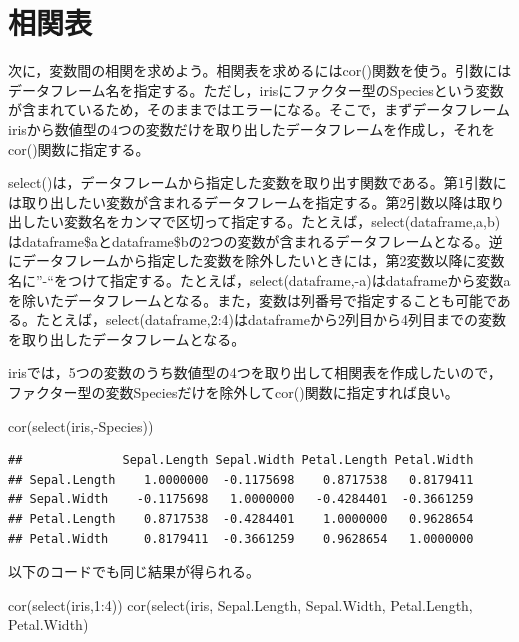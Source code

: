 \documentclass[
]{book}
\newenvironment{Shaded}{\begin{snugshade}}{\end{snugshade}}
\newcommand{\DecValTok}[1]{\textcolor[rgb]{0.00,0.00,0.81}{#1}}
\newcommand{\FunctionTok}[1]{\textcolor[rgb]{0.00,0.00,0.00}{#1}}
\newcommand{\NormalTok}[1]{#1}
\newcommand{\SpecialCharTok}[1]{\textcolor[rgb]{0.00,0.00,0.00}{#1}}
\begin{document}
\hypertarget{ux76f8ux95a2ux8868}{%
\section{相関表}\label{ux76f8ux95a2ux8868}}

次に，変数間の相関を求めよう。相関表を求めるにはcor()関数を使う。引数にはデータフレーム名を指定する。ただし，irisにファクター型のSpeciesという変数が含まれているため，そのままではエラーになる。そこで，まずデータフレームirisから数値型の4つの変数だけを取り出したデータフレームを作成し，それをcor()関数に指定する。

select()は，データフレームから指定した変数を取り出す関数である。第1引数には取り出したい変数が含まれるデータフレームを指定する。第2引数以降は取り出したい変数名をカンマで区切って指定する。たとえば，select(dataframe,a,b)はdataframe\$aとdataframe\$bの2つの変数が含まれるデータフレームとなる。逆にデータフレームから指定した変数を除外したいときには，第2変数以降に変数名に''-``をつけて指定する。たとえば，select(dataframe,-a)はdataframeから変数aを除いたデータフレームとなる。また，変数は列番号で指定することも可能である。たとえば，select(dataframe,2:4)はdataframeから2列目から4列目までの変数を取り出したデータフレームとなる。

irisでは，5つの変数のうち数値型の4つを取り出して相関表を作成したいので，ファクター型の変数Speciesだけを除外してcor()関数に指定すれば良い。

\begin{Shaded}
\begin{Highlighting}[]
\FunctionTok{cor}\NormalTok{(}\FunctionTok{select}\NormalTok{(iris,}\SpecialCharTok{{-}}\NormalTok{Species))}
\end{Highlighting}
\end{Shaded}

\begin{verbatim}
##              Sepal.Length Sepal.Width Petal.Length Petal.Width
## Sepal.Length    1.0000000  -0.1175698    0.8717538   0.8179411
## Sepal.Width    -0.1175698   1.0000000   -0.4284401  -0.3661259
## Petal.Length    0.8717538  -0.4284401    1.0000000   0.9628654
## Petal.Width     0.8179411  -0.3661259    0.9628654   1.0000000
\end{verbatim}

以下のコードでも同じ結果が得られる。

\begin{Shaded}
\begin{Highlighting}[]
\FunctionTok{cor}\NormalTok{(}\FunctionTok{select}\NormalTok{(iris,}\DecValTok{1}\SpecialCharTok{:}\DecValTok{4}\NormalTok{))}
\FunctionTok{cor}\NormalTok{(}\FunctionTok{select}\NormalTok{(iris, Sepal.Length, Sepal.Width, Petal.Length, Petal.Width)}
\end{Highlighting}
\end{Shaded}
\end{document}
